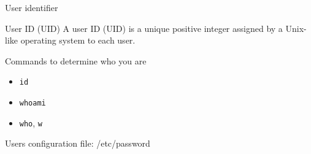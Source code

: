 \begin{frame}[fragile]{User identifier}

\begin{block}{User ID (UID)}
\alert{A user ID (UID)} is a unique positive integer assigned by a Unix-like operating system to each user.
\end{block}

Commands to determine who you are
  \begin{itemize}
    \item \verb|id|
    \item \verb|whoami|
    \item \verb|who|, \verb|w|
  \end{itemize}
Users configuration file:  \alert{/etc/password}
\end{frame}
